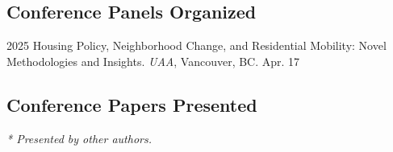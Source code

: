 \documentclass[11pt,letterpaper]{article}
\begin{document}
\subsection{Conference Panels Organized}
\begin{tablist}
  \item[2025] \tab{}Housing Policy, Neighborhood Change, and Residential Mobility: Novel Methodologies and Insights. \emph{UAA}, Vancouver, BC. Apr. 17
\end{tablist}

\subsection{Conference Papers Presented}
{\footnotesize\emph{* Presented by other authors.}}\par\vspace{.35\baselineskip}
\end{document}
